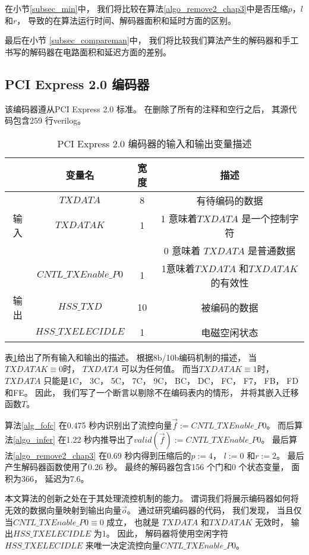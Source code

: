 在小节\ref{subsec_min}中，
我们将比较在算法\ref{algo_remove2_chap3}中是否压缩$p$，$l$ 和$r$，
导致的在算法运行时间、解码器面积和延时方面的区别。

最后在小节 \ref{subsec_compareman}中，
我们将比较我们算法产生的解码器和手工书写的解码器在电路面积和延迟方面的差别。


\subsection{PCI Express 2.0 编码器}\label{subsec_pcie2}
该编码器遵从PCI Express 2.0 标准。
在删除了所有的注释和空行之后，
其源代码包含259 行verilog。

\begin{table}[b]%
\caption{PCI Express 2.0 编码器的输入和输出变量描述}
\label{tab:pcieio}
\centering
\begin{tabular}{|c|c|c|c|}
\hline
         & 变量名               & 宽度  &描述\\\hline\hline
         & $TXDATA$             & 8     &有待编码的数据\\\cline{2-4}
输入     & $TXDATAK$            & 1     &1 意味着$TXDATA$ 是一个控制字符 \\
         &                      &       &0 意味着 $TXDATA$ 是普通数据\\\cline{2-4}
         & $CNTL\_TXEnable\_P0$ & 1     &1意味着$TXDATA$ 和$TXDATAK$的有效性\\\hline
输出     & $HSS\_TXD$           & 10    &被编码的数据\\\cline{2-4}
         & $HSS\_TXELECIDLE$    & 1     &电磁空闲状态\\\hline
\end{tabular}
\end{table}%

表\ref{tab:pcieio}给出了所有输入和输出的描述。
根据8b/10b编码机制的描述，
当 $TXDATAK\equiv 0$时，
$TXDATA$ 可以为任何值。
而当$TXDATAK\equiv 1$时，
$TXDATA$ 只能是1C， 3C， 5C， 7C， 9C， BC， DC， FC， F7， FB， FD 和FE。
因此，
我们写了一个断言以剔除不在编码表内的情形，
并将其嵌入迁移函数$T$。

算法\ref{alg_fofc} 在0.475 秒内识别出了流控向量$\vec{f}:=CNTL\_TXEnable\_P0$。
而后算法\ref{algo_infer} 在1.22 秒内推导出了$valid(\vec{f}):=CNTL\_TXEnable\_P0$。
最后算法\ref{algo_remove2_chap3} 在0.69 秒内得到压缩后的$p:=4$， $l:=0$ 和$r:=2$。
最后
产生解码器函数使用了0.26 秒。
最终的解码器包含156 个门和0 个状态变量，
面积为366，
延迟为7.6。


本文算法的创新之处在于其处理流控机制的能力。
谓词我们将展示编码器如何将无效的数据向量映射到输出向量$\vec{o}$。
通过研究编码器的代码，
我们发现，
当且仅当$CNTL\_TXEnable\_P0\equiv 0$ 成立，
也就是
$TXDATA$ 和$TXDATAK$ 无效时，
输出$HSS\_TXELECIDLE$ 为1。
因此，
解码器将使用空闲字符$HSS\_TXELECIDLE$ 来唯一决定流控向量$CNTL\_TXEnable\_P0$。


